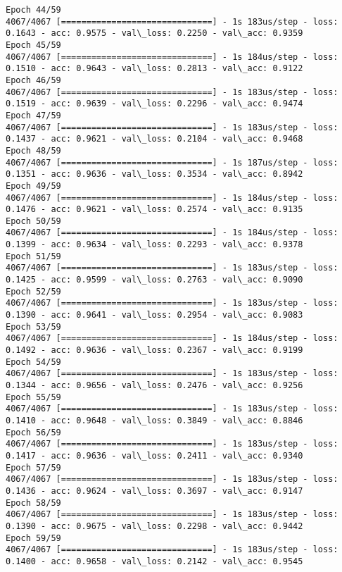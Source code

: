 \documentclass[11pt]{article}
\begin{document}
\begin{Verbatim}[commandchars=\\\{\}]
Epoch 44/59
4067/4067 [==============================] - 1s 183us/step - loss: 0.1643 - acc: 0.9575 - val\_loss: 0.2250 - val\_acc: 0.9359
Epoch 45/59
4067/4067 [==============================] - 1s 184us/step - loss: 0.1510 - acc: 0.9643 - val\_loss: 0.2813 - val\_acc: 0.9122
Epoch 46/59
4067/4067 [==============================] - 1s 183us/step - loss: 0.1519 - acc: 0.9639 - val\_loss: 0.2296 - val\_acc: 0.9474
Epoch 47/59
4067/4067 [==============================] - 1s 183us/step - loss: 0.1437 - acc: 0.9621 - val\_loss: 0.2104 - val\_acc: 0.9468
Epoch 48/59
4067/4067 [==============================] - 1s 187us/step - loss: 0.1351 - acc: 0.9636 - val\_loss: 0.3534 - val\_acc: 0.8942
Epoch 49/59
4067/4067 [==============================] - 1s 184us/step - loss: 0.1476 - acc: 0.9621 - val\_loss: 0.2574 - val\_acc: 0.9135
Epoch 50/59
4067/4067 [==============================] - 1s 184us/step - loss: 0.1399 - acc: 0.9634 - val\_loss: 0.2293 - val\_acc: 0.9378
Epoch 51/59
4067/4067 [==============================] - 1s 183us/step - loss: 0.1425 - acc: 0.9599 - val\_loss: 0.2763 - val\_acc: 0.9090
Epoch 52/59
4067/4067 [==============================] - 1s 183us/step - loss: 0.1390 - acc: 0.9641 - val\_loss: 0.2954 - val\_acc: 0.9083
Epoch 53/59
4067/4067 [==============================] - 1s 184us/step - loss: 0.1492 - acc: 0.9636 - val\_loss: 0.2367 - val\_acc: 0.9199
Epoch 54/59
4067/4067 [==============================] - 1s 183us/step - loss: 0.1344 - acc: 0.9656 - val\_loss: 0.2476 - val\_acc: 0.9256
Epoch 55/59
4067/4067 [==============================] - 1s 183us/step - loss: 0.1410 - acc: 0.9648 - val\_loss: 0.3849 - val\_acc: 0.8846
Epoch 56/59
4067/4067 [==============================] - 1s 183us/step - loss: 0.1417 - acc: 0.9636 - val\_loss: 0.2411 - val\_acc: 0.9340
Epoch 57/59
4067/4067 [==============================] - 1s 183us/step - loss: 0.1436 - acc: 0.9624 - val\_loss: 0.3697 - val\_acc: 0.9147
Epoch 58/59
4067/4067 [==============================] - 1s 183us/step - loss: 0.1390 - acc: 0.9675 - val\_loss: 0.2298 - val\_acc: 0.9442
Epoch 59/59
4067/4067 [==============================] - 1s 183us/step - loss: 0.1400 - acc: 0.9658 - val\_loss: 0.2142 - val\_acc: 0.9545

    \end{Verbatim}
\end{document}
